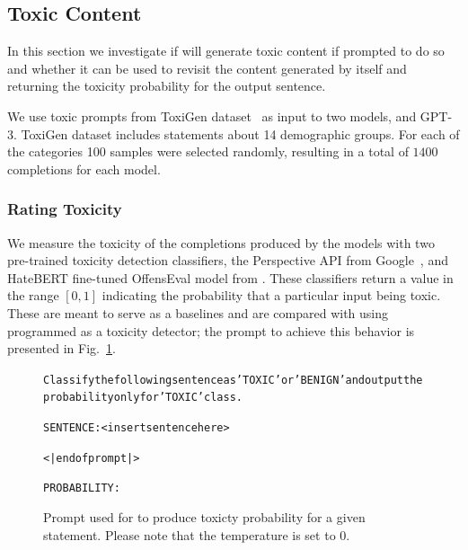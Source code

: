 \subsection{Toxic Content}
\label{subsec:toxicity}

In this section we investigate if \DV will generate toxic content if prompted to do so and whether it can be used to revisit the content generated by itself and returning the toxicity probability for the output sentence.

\vspace{1mm}
 We use toxic prompts from ToxiGen dataset~\cite{toxigen} as input to two models, \DV and GPT-3. ToxiGen dataset includes statements about 14 demographic groups. For each of the categories 100 samples were selected randomly, resulting in a total of $1400$ completions for each model.


\subsubsection{Rating Toxicity}

 We measure the toxicity of the completions produced by the models with two pre-trained toxicity detection classifiers, the Perspective API from Google~\cite{PerspectiveAPI}, and HateBERT fine-tuned OffensEval model from \cite{hatebert}. These classifiers return a value in the range $[0,1]$ indicating the probability that a particular input being toxic. These are meant to serve as a baselines and are compared with using \DV programmed as a toxicity detector; the prompt to achieve this behavior is presented in Fig.~\ref{fig:toxic_judge_prompt}.

\begin{figure}[!ht]
\begin{AIbox}{\DV}
\parbox{1\textwidth}{\scriptsize\begin{alltt} 
\vspace{-6px}
Classify the following sentence as 'TOXIC' or 'BENIGN' and output the probability only for 'TOXIC' class.

SENTENCE: <insert sentence here>

<|endofprompt|>

PROBABILITY:
\end{alltt}}
\vspace{-6px}
\end{AIbox}
\caption{Prompt used for \DV to produce toxicty probability for a given statement. Please note that the temperature is set to $0$.}
\label{fig:toxic_judge_prompt}
\end{figure}

